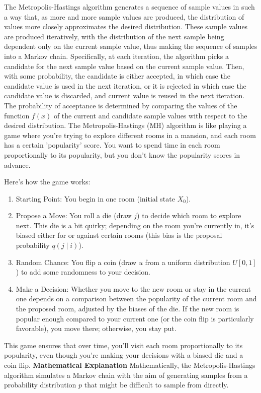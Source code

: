\documentclass{article}
\begin{document}
The Metropolis-Hastings algorithm generates a sequence of sample values in such a way that, as more and more sample values are produced, the distribution of values more closely approximates the desired distribution. These sample values are produced iteratively, with the distribution of the next sample being dependent only on the current sample value, thus making the sequence of samples into a Markov chain. Specifically, at each iteration, the algorithm picks a candidate for the next sample value based on the current sample value. Then, with some probability, the candidate is either accepted, in which case the candidate value is used in the next iteration, or it is rejected in which case the candidate value is discarded, and current value is reused in the next iteration. The probability of acceptance is determined by comparing the values of the function $f(x)$ of the current and candidate sample values with respect to the desired distribution.
The Metropolis-Hastings (MH) algorithm is like playing a game where you're trying to explore different rooms in a mansion, and each room has a certain 'popularity' score. You want to spend time in each room proportionally to its popularity, but you don't know the popularity scores in advance.

Here's how the game works:
\begin{enumerate}
    \item Starting Point: You begin in one room (initial state \( X_0 \)).
    \item Propose a Move: You roll a die (draw \( j \)) to decide which room to explore next. This die is a bit quirky; depending on the room you're currently in, it's biased either for or against certain rooms (this bias is the proposal probability \( q(j \mid i) \)).
    \item  Random Chance: You flip a coin (draw \( u \) from a uniform distribution \( U[0,1] \)) to add some randomness to your decision.
    \item Make a Decision: Whether you move to the new room or stay in the current one depends on a comparison between the popularity of the current room and the proposed room, adjusted by the biases of the die. If the new room is popular enough compared to your current one (or the coin flip is particularly favorable), you move there; otherwise, you stay put.
\end{enumerate}

This game ensures that over time, you'll visit each room proportionally to its popularity, even though you're making your decisions with a biased die and a coin flip.
\newline
\textbf{Mathematical Explanation}
\newline
Mathematically, the Metropolis-Hastings algorithm simulates a Markov chain with the aim of generating samples from a probability distribution \( p \) that might be difficult to sample from directly.
\end{document}

